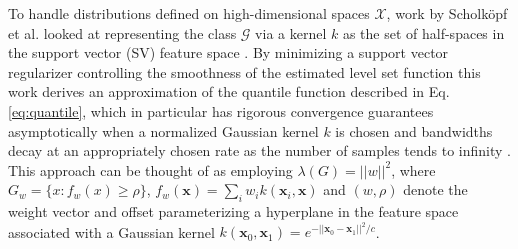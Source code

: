 \documentclass[10pt, conference]{ieeeconf}      %
\newcommand{\bx}{\mathbf{x}}
\begin{document}
To handle distributions defined on high-dimensional spaces $\mathcal{X}$, work by Scholk{\"o}pf et al. looked at representing the class $\mathcal{G}$ via a kernel $k$ as the set of half-spaces in the support vector (SV) feature space \cite{scholkopf2001estimating}. 
By minimizing a support vector regularizer controlling the smoothness of the estimated level set function this work
derives an approximation of the quantile function described in Eq. \ref{eq:quantile}, which in particular has rigorous
convergence guarantees asymptotically when a normalized Gaussian kernel $k$ is chosen and bandwidths decay at an
appropriately chosen rate as the number of samples tends to infinity \cite{vert2006consistency}.
This approach can be thought of as employing $\lambda(G) = ||w||^2$, where $G_w = \lbrace x: f_w(x) \geq \rho \rbrace$,
$f_w(\mathbf{x}) = \sum_i w_i k(\mathbf{x}_i, \mathbf{x})$
and $(w,\rho)$ denote the weight vector and offset parameterizing a hyperplane in the feature space associated with a
Gaussian kernel $k(\bx_0,\bx_1) = e^{-||\bx_0 - \bx_1||^2/c}$.
\end{document}
